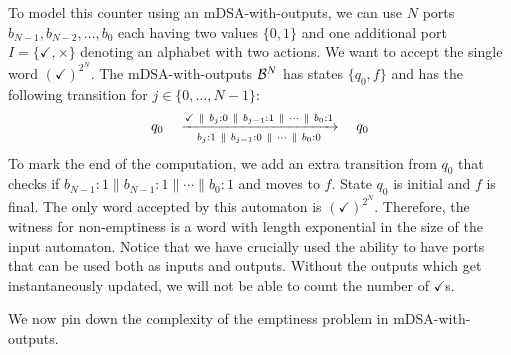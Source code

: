 To model this counter using an mDSA-with-outputs, we can use $N$ ports $b_{N-1}, b_{N-2}, \dots, b_0$ each having two values $\{0, 1\}$ and one additional port $I = \{ \checkmark, \times \}$ denoting an alphabet with two actions. We want to accept the single word $(\checkmark)^{2^N}$. The mDSA-with-outputs $\mathcal{B}^N$ has states $\{q_0, f\}$ and has the following transition for $j\in \{0, \dots, N-1\}$:
\begin{align*}
q_0 \quad \xrightarrow[~~b_j:1 ~\parallel~ b_{j-1}:0 ~\parallel~ \cdots ~\parallel~ b_0: 0~~]{\checkmark ~\parallel~ b_j:0 ~\parallel~ b_{j-1}:1 ~\parallel~ \cdots ~\parallel~ b_0: 1} \quad q_0
\end{align*}
To mark the end of the computation, we add an extra transition from $q_0$ that checks if $b_{N-1}:1 \parallel b_{N-1}:1 \parallel \cdots \parallel b_0:1$ and moves to $f$. State $q_0$ is initial and $f$ is final. The only word accepted by this automaton is $(\checkmark)^{2^N}$. Therefore, the witness for non-emptiness is a word with length exponential in the size of the input automaton. Notice that we have crucially used the ability to have ports that can be used both as inputs and outputs. Without the outputs which get instantaneously updated, we will not be able to count the number of $\checkmark$s. 

We now pin down the complexity of the emptiness problem in mDSA-with-outputs. 

\endinput
In order to represent Expressive Decision Tables (EDTs) succinctly, we require an additional feature in the automaton -- the presence of output ports and more importantly input/output (IO) ports. When a transition is matched, we also require a certain output to be produced in an output port. Sometimes, these output ports can also be treated as inputs and checked for suffixes in the transition labels. Such ports will be called IO ports. Addition of these special ports enables a clean translation of EDTs to mDSAs. At the same time, as we will see, they make the emptiness problem significantly more complex. 

\subsection{Formal syntax} 

Below, we detail each element in the syntax of mDSA-with-outputs.

\paragraph*{The multiport alphabet.} The multiport alphabet is now partitioned into three kinds: input ports, IO ports, and output ports. Let $\sigmain = (\Sigma_1^{i}, \Sigma_2^{i}, \dots, \Sigma_{k_1}^{i})$ be a set of input ports, $\sigmaio =(\Sigma_1^{io}, \Sigma_2^{io}, \dots, \Sigma_{k_2}^{io})$ be a set of IO ports and $\sigmaout = (\Sigma_1^{o}, \Sigma_2^{o}, \dots, \Sigma_{k_3}^{o})$ be a set of output ports. Each port is a finite alphabet. Further, we assume that no two alphabets coincide: therefore, each letter uniquely identifies the port that it is present in. 


